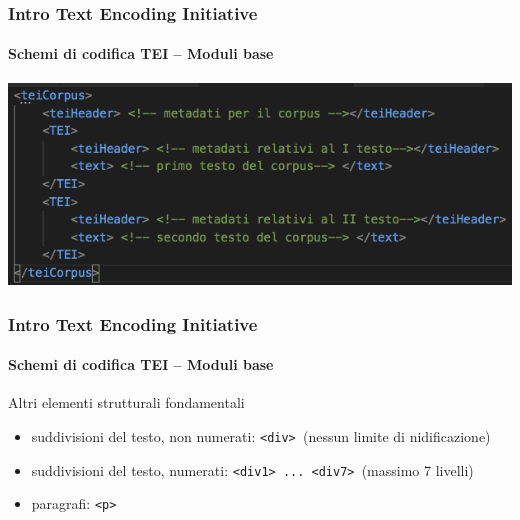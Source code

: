 \begin{frame}
	\frametitle{Intro Text Encoding Initiative}
	\framesubtitle{Schemi di codifica TEI – Moduli base}
	\addtocounter{nframe}{1}
	\begin{center}
		\includegraphics[width=.95\textwidth]{imgs/composito2.png}
	\end{center}

\end{frame}





\begin{frame}
	\frametitle{Intro Text Encoding Initiative}
	\framesubtitle{Schemi di codifica TEI – Moduli base}
	\addtocounter{nframe}{1}

	\begin{block}{Altri elementi strutturali fondamentali}
        \begin{itemize}
            \item suddivisioni del testo, non numerati: \texttt{<div> }(nessun limite di nidificazione)
            \item suddivisioni del testo, numerati: \texttt{<div1> ... <div7> }(massimo 7 livelli)
            \item paragrafi: \texttt{<p>}
        \end{itemize}
        
    \end{block}
\end{frame}


